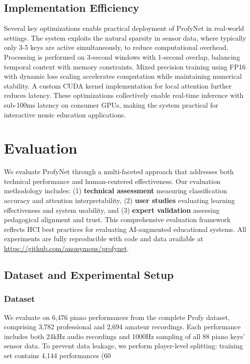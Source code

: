 \documentclass[sigconf,review,anonymous]{acmart}
\begin{document}
\subsection{Implementation Efficiency}

Several key optimizations enable practical deployment of ProfyNet in real-world settings. The system exploits the natural sparsity in sensor data, where typically only 3-5 keys are active simultaneously, to reduce computational overhead. Processing is performed on 3-second windows with 1-second overlap, balancing temporal context with memory constraints. Mixed precision training using FP16 with dynamic loss scaling accelerates computation while maintaining numerical stability. A custom CUDA kernel implementation for local attention further reduces latency. These optimizations collectively enable real-time inference with sub-100ms latency on consumer GPUs, making the system practical for interactive music education applications.

\section{Evaluation}

We evaluate ProfyNet through a multi-faceted approach that addresses both technical performance and human-centered effectiveness. Our evaluation methodology includes: (1) \textbf{technical assessment} measuring classification accuracy and attention interpretability, (2) \textbf{user studies} evaluating learning effectiveness and system usability, and (3) \textbf{expert validation} assessing pedagogical alignment and trust. This comprehensive evaluation framework reflects HCI best practices for evaluating AI-augmented educational systems. All experiments are fully reproducible with code and data available at \url{https://github.com/anonymous/profynet}.

\subsection{Dataset and Experimental Setup}

\subsubsection{Dataset}
We evaluate on 6,476 piano performances from the complete Profy dataset, comprising 3,782 professional and 2,694 amateur recordings. Each performance includes both 24kHz audio recordings and 1000Hz sampling of all 88 piano keys' sensor data. To prevent data leakage, we perform player-level splitting: training set contains 4,144 performances (60%
\end{document}
